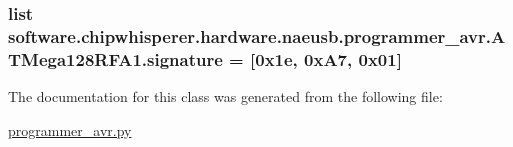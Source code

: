 \subsubsection[{signature}]{\setlength{\rightskip}{0pt plus 5cm}list software.\+chipwhisperer.\+hardware.\+naeusb.\+programmer\+\_\+avr.\+A\+T\+Mega128\+R\+F\+A1.\+signature = \mbox{[}0x1e, 0x\+A7, 0x01\mbox{]}\hspace{0.3cm}{\ttfamily [static]}}\label{classsoftware_1_1chipwhisperer_1_1hardware_1_1naeusb_1_1programmer__avr_1_1ATMega128RFA1_abd6cd5dd1d8d4f3cbb5c0741caef967d}


The documentation for this class was generated from the following file\+:\begin{DoxyCompactItemize}
\item 
\hyperlink{programmer__avr_8py}{programmer\+\_\+avr.\+py}\end{DoxyCompactItemize}
